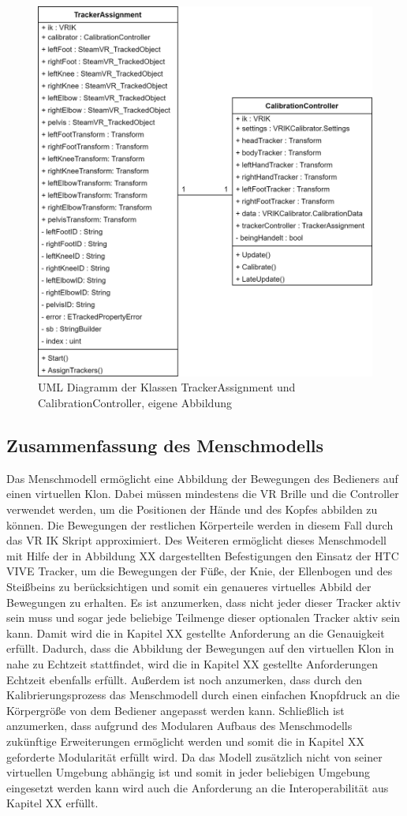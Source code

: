 \begin{figure}[h]
	\centering
	\includegraphics[width=0.65\linewidth]{Bilder/A40_MenschUML}
	\caption{UML Diagramm der Klassen TrackerAssignment und CalibrationController, eigene Abbildung}
	\label{fig:MenschUML}
\end{figure}

\subsection{Zusammenfassung des Menschmodells}\label{sec:MMFunktionen}
Das Menschmodell ermöglicht eine Abbildung der Bewegungen des Bedieners auf einen virtuellen Klon. Dabei müssen mindestens die VR Brille und die Controller verwendet werden, um die Positionen der Hände und des Kopfes abbilden zu können. Die Bewegungen der restlichen Körperteile werden in diesem Fall durch das VR IK Skript approximiert. Des Weiteren ermöglicht dieses Menschmodell mit Hilfe der in Abbildung XX dargestellten Befestigungen den Einsatz der HTC VIVE Tracker, um die Bewegungen der Füße, der Knie, der Ellenbogen und des Steißbeins zu berücksichtigen und somit ein genaueres virtuelles Abbild der Bewegungen zu erhalten. Es ist anzumerken, dass nicht jeder dieser Tracker aktiv sein muss und sogar jede beliebige Teilmenge dieser optionalen Tracker aktiv sein kann. Damit wird die in Kapitel XX gestellte Anforderung an die Genauigkeit erfüllt. Dadurch, dass die Abbildung der Bewegungen auf den virtuellen Klon in nahe zu Echtzeit stattfindet, wird die in Kapitel XX gestellte Anforderungen Echtzeit ebenfalls erfüllt. Außerdem ist noch anzumerken, dass durch den Kalibrierungsprozess das Menschmodell durch einen einfachen Knopfdruck an die Körpergröße von dem Bediener angepasst werden kann. Schließlich ist anzumerken, dass aufgrund des Modularen Aufbaus des Menschmodells zukünftige Erweiterungen ermöglicht werden und somit die in Kapitel XX geforderte Modularität erfüllt wird. Da das Modell zusätzlich nicht von seiner virtuellen Umgebung abhängig ist und somit in jeder beliebigen Umgebung eingesetzt werden kann wird auch die Anforderung an die Interoperabilität aus Kapitel XX erfüllt.
